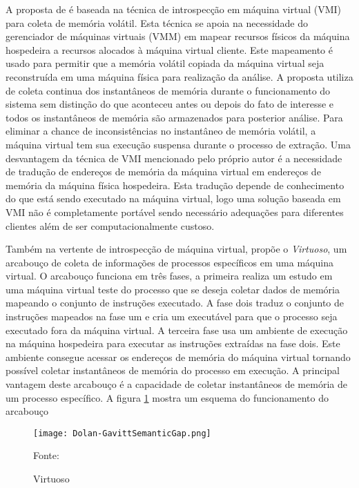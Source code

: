 A proposta de \cite{PoiselVMI:2013} é baseada na técnica de introspecção em máquina virtual (VMI) para coleta de memória volátil. 
%
Esta técnica se apoia na necessidade do gerenciador de máquinas virtuais (VMM) em mapear recursos físicos da máquina hospedeira a recursos alocados à máquina virtual cliente.
%
Este mapeamento é usado para permitir que a memória volátil copiada da máquina virtual seja reconstruída em uma máquina física para realização da análise.
%
A proposta utiliza de coleta continua dos instantâneos de memória durante o funcionamento do sistema sem distinção do que aconteceu antes ou depois do fato de interesse e todos os instantâneos de memória são armazenados para posterior análise.
%
Para eliminar a chance de inconsistências no instantâneo de memória volátil, a máquina virtual tem sua execução suspensa durante o processo de extração.
%
Uma desvantagem da técnica de VMI mencionado pelo próprio autor é a necessidade de tradução de endereços de memória da máquina virtual em endereços de memória da máquina física hospedeira.
%
Esta tradução depende de conhecimento do que está sendo executado na máquina virtual, logo uma solução baseada em VMI não é completamente portável sendo necessário adequações para diferentes clientes além de ser computacionalmente custoso.
%

Também na vertente de introspecção de máquina virtual, \cite{Dolan-GavittSemanticGap:2011} propõe o \textit{Virtuoso}, um arcabouço de coleta de informações de processos específicos em uma máquina virtual.
%
O arcabouço funciona em três fases, a primeira realiza um estudo em uma máquina virtual teste do processo que se deseja coletar dados de memória mapeando o conjunto de instruções executado. 
%
A fase dois traduz o conjunto de instruções mapeados na fase um e cria um executável para que o processo seja executado fora da máquina virtual.
%
A terceira fase usa um ambiente de execução na máquina hospedeira para executar as instruções extraídas na fase dois. Este ambiente consegue acessar os endereços de memória do máquina virtual tornando possível coletar instantâneos de memória do processo em execução.
%
A principal vantagem deste arcabouço é a capacidade de coletar instantâneos de memória de um processo específico.
%
A figura \ref{fig:Dolan-GavittSemanticGap} mostra um esquema do funcionamento do arcabouço

\begin{figure}[htb!]
\footnotesize
\caption{Virtuoso}
\texttt{[image: Dolan-GavittSemanticGap.png]}
\centering
\label{fig:Dolan-GavittSemanticGap}
\begin{center}
Fonte: \cite{Dolan-GavittSemanticGap:2011} 
\end{center}
\end{figure}


